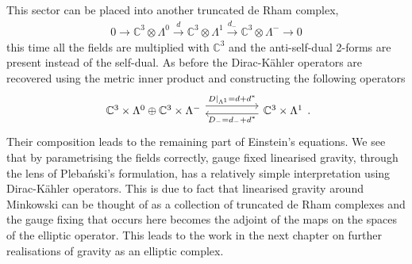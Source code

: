 \documentclass[10pt]{report}
\newcommand{\pleb}[0]{Pleba\'nski}
\theoremstyle{definition}
\newcommand{\C}[0]{\mathbb{C}}
\newcommand{\E}[0]{\C^3}
\begin{document}
        This sector can be placed into another truncated de Rham complex,
        \begin{align}
            0 \longrightarrow \E \otimes \Lambda^0 \overset{d}{\longrightarrow} \E \otimes \Lambda^1 \overset{d_-}{\longrightarrow} \E \otimes \Lambda^- \longrightarrow 0
        \end{align}
        this time all the fields are multiplied with $\C^3$ and the anti-self-dual 2-forms are present instead of the self-dual. As before the Dirac-K\"ahler operators are recovered using the metric inner product and constructing the following operators
        \begin{equation}
            \begin{tikzcd}
                \E \times \Lambda^0 \oplus \E \times \Lambda^- \arrow[rr, "D|_{\Lambda^1} = d+d^*", shift left=2] &  &  \E \times  \Lambda^1 \arrow[ll, "D_- =d_- + d^*", shift left]
            \end{tikzcd}.
        \end{equation}
        Their composition leads to the remaining part of Einstein's equations. We see that by parametrising the fields correctly, gauge fixed linearised gravity, through the lens of \pleb{}'s formulation, has a relatively simple interpretation using Dirac-K\"ahler operators. This is due to fact that linearised gravity around Minkowski can be thought of as a collection of truncated de Rham complexes and the gauge fixing that occurs here becomes the adjoint of the maps on the spaces of the elliptic operator. This leads to the work in the next chapter on further realisations of gravity as an elliptic complex.


    \newpage
\end{document}
